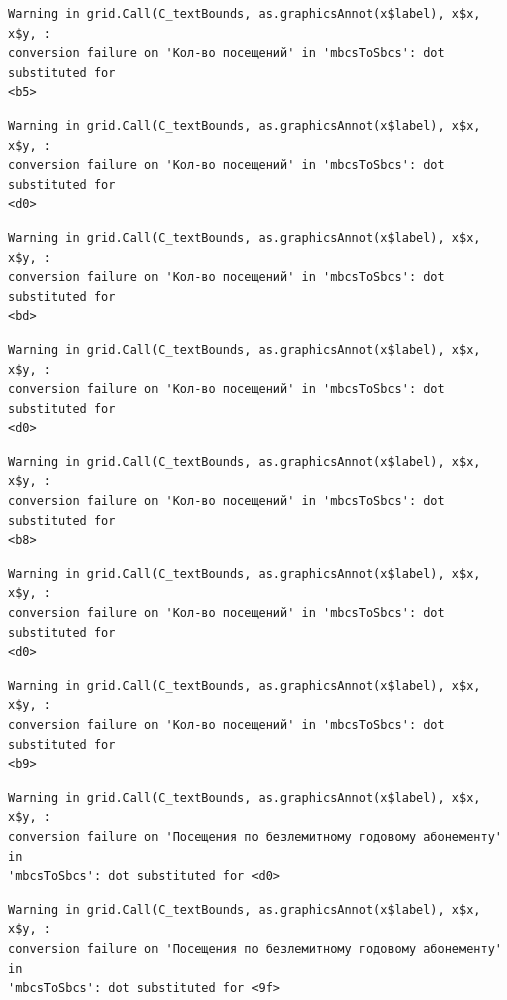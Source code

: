\documentclass[
  letterpaper,
  DIV=11,
  numbers=noendperiod]{scrartcl}
\begin{document}
\begin{verbatim}
Warning in grid.Call(C_textBounds, as.graphicsAnnot(x$label), x$x, x$y, :
conversion failure on 'Кол-во посещений' in 'mbcsToSbcs': dot substituted for
<b5>
\end{verbatim}

\begin{verbatim}
Warning in grid.Call(C_textBounds, as.graphicsAnnot(x$label), x$x, x$y, :
conversion failure on 'Кол-во посещений' in 'mbcsToSbcs': dot substituted for
<d0>
\end{verbatim}

\begin{verbatim}
Warning in grid.Call(C_textBounds, as.graphicsAnnot(x$label), x$x, x$y, :
conversion failure on 'Кол-во посещений' in 'mbcsToSbcs': dot substituted for
<bd>
\end{verbatim}

\begin{verbatim}
Warning in grid.Call(C_textBounds, as.graphicsAnnot(x$label), x$x, x$y, :
conversion failure on 'Кол-во посещений' in 'mbcsToSbcs': dot substituted for
<d0>
\end{verbatim}

\begin{verbatim}
Warning in grid.Call(C_textBounds, as.graphicsAnnot(x$label), x$x, x$y, :
conversion failure on 'Кол-во посещений' in 'mbcsToSbcs': dot substituted for
<b8>
\end{verbatim}

\begin{verbatim}
Warning in grid.Call(C_textBounds, as.graphicsAnnot(x$label), x$x, x$y, :
conversion failure on 'Кол-во посещений' in 'mbcsToSbcs': dot substituted for
<d0>
\end{verbatim}

\begin{verbatim}
Warning in grid.Call(C_textBounds, as.graphicsAnnot(x$label), x$x, x$y, :
conversion failure on 'Кол-во посещений' in 'mbcsToSbcs': dot substituted for
<b9>
\end{verbatim}

\begin{verbatim}
Warning in grid.Call(C_textBounds, as.graphicsAnnot(x$label), x$x, x$y, :
conversion failure on 'Посещения по безлемитному годовому абонементу' in
'mbcsToSbcs': dot substituted for <d0>
\end{verbatim}

\begin{verbatim}
Warning in grid.Call(C_textBounds, as.graphicsAnnot(x$label), x$x, x$y, :
conversion failure on 'Посещения по безлемитному годовому абонементу' in
'mbcsToSbcs': dot substituted for <9f>
\end{verbatim}
\end{document}
